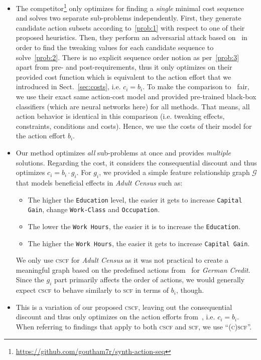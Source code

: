 \documentclass[runningheads, envcountsame, a4paper]{llncs}
\newcommand{\ours}{\textsc{cscf}}
\newcommand{\oursShort}{\ours}
\newcommand{\oursBoth}{\textsc{(c)scf}}
\newcommand{\mainEA}{\oursShort}
\newcommand{\competitor}{\textsc{synth}}
\newcommand{\alternativeEA}{\textsc{scf}}
\newcommand{\adultDataset}{\emph{Adult Census}}
\newcommand{\germanDataset}{\emph{German Credit}}
\newcommand{\dependencyGraph}{\mathcal{G}}
\newcommand{\consequentialCosts}{g}
\newcommand{\baseCosts}{b}
\newcommand{\costs}{c}
\begin{document}
\begin{itemize}[align=left]
\item[\textbf{\competitor{}}~\cite{ramakrishnanSynthesizingActionSequences2020}:] The competitor\footnote{\url{https://github.com/goutham7r/synth-action-seq}} only optimizes for finding a \emph{single} minimal cost sequence and solves two separate sub-problems independently. First, they generate candidate action subsets according to~\ref{prob:1} with respect to one of their proposed heuristics. Then, they perform an adversarial attack based on~\cite{carliniEvaluatingRobustnessNeural2017} in order to find the tweaking values for each candidate sequence to solve~\ref{prob:2}.
There is no explicit sequence order notion as per~\ref{prob:3} apart from pre- and post-requirements, thus it only optimizes on their provided cost function which is equivalent to the action effort that we introduced in Sect.~\ref{sec:costs}, i.e. $\costs_i = \baseCosts_i$.
To make the comparison to~\cite{ramakrishnanSynthesizingActionSequences2020} fair, we use their exact same action-cost model and provided pre-trained black-box classifiers (which are neural networks here) for all methods.
That means, all action behavior is identical in this comparison (i.e. tweaking effects, constraints, conditions and costs). Hence, we use the costs of their model for the action effort $\baseCosts_i$.
\item[\textbf{\mainEA{}}:] Our method optimizes \emph{all} sub-problems at once and provides \emph{multiple} solutions. Regarding the cost, it considers the consequential discount and thus optimizes $\costs_i = \baseCosts_i \cdot \consequentialCosts_i$.
For $\consequentialCosts_i$, we provided a simple feature relationship graph $\dependencyGraph$ that models beneficial effects in \adultDataset{} such as:
\begin{itemize}
    \item The higher the \texttt{Education} level, the easier it gets to increase \texttt{Capital Gain}, change \texttt{Work-Class} and \texttt{Occupation}.
    \item The lower the \texttt{Work Hours}, the easier it is to increase the \texttt{Education}.
    \item The higher the \texttt{Work Hours}, the easier it gets to increase \texttt{Capital Gain}.
\end{itemize}
We only use \mainEA{} for \adultDataset{} as it was not practical to create a meaningful graph based on the predefined actions from~\cite{ramakrishnanSynthesizingActionSequences2020} for \germanDataset{}.
Since the $\consequentialCosts_i$ part primarily affects the order of actions, we would generally expect \mainEA{} to behave similarly to \alternativeEA{} in terms of $\baseCosts_i$, though.
\item[\textbf{\alternativeEA{}}:] This is a variation of our proposed \mainEA{}, leaving out the consequential discount and thus only optimizes on the action efforts from~\cite{ramakrishnanSynthesizingActionSequences2020}, i.e. $\costs_i = \baseCosts_i$.
When referring to findings that apply to both \mainEA{} and \alternativeEA{}, we use \enquote{\oursBoth{}}.
\end{itemize}
\end{document}
